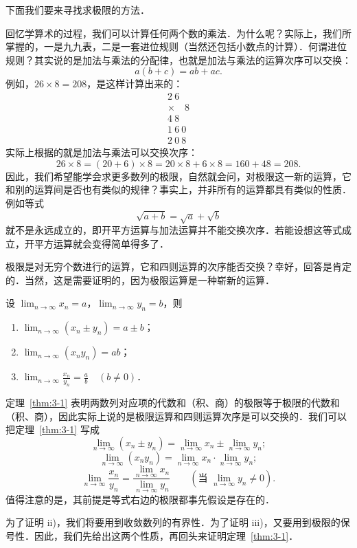 下面我们要来寻找求极限的方法．

回忆学算术的过程，我们可以计算任何两个数的乘法．为什么呢？实际上，我们所掌握的，一是九九表，二是一套进位规则（当然还包括小数点的计算）．何谓进位规则？其实说的是加法与乘法的分配律，也就是加法与乘法的运算次序可以交换：
\[
a(b+c) = ab + ac.
\]
例如，$26 \times 8 = 208$，是这样计算出来的：
\[
\begin{array}{r}
2\ 6 \\
\times \quad 8 \\
\hline
4\ 8 \\
1\ 6\ 0 \\
\hline
2\ 0\ 8
\end{array}
\]
实际上根据的就是加法与乘法可以交换次序：
\[
26\times8 = (20+6)\times8 = 20\times8 + 6\times8 = 160 + 48 = 208.
\]
因此，我们希望能学会求更多数列的极限，自然就会问，对极限这一新的运算，它和别的运算间是否也有类似的规律？事实上，并非所有的运算都具有类似的性质．例如等式
\[
\sqrt{a+b} = \sqrt{a} + \sqrt{b}
\]
就不是永远成立的，即开平方运算与加法运算并不能交换次序．若能设想这等式成立，开平方运算就会变得简单得多了．

极限是对无穷个数进行的运算，它和四则运算的次序能否交换？幸好，回答是肯定的．当然，这是需要证明的，因为极限运算是一种崭新的运算．

\begin{theorem}\label{thm:3-1}
设 $\lim_{n\to\infty}x_n = a$，$\lim_{n\to\infty}y_n = b$，则
\begin{enumerate}[label=\roman*)]
\item $\lim_{n\to\infty}(x_n \pm y_n) = a \pm b$；
\item $\lim_{n \to \infty} (x_n y_n) = ab$；
\item $\lim_{n \to \infty} \frac{x_n}{y_n} = \frac{a}{b} \quad (b \neq 0)$．
\end{enumerate}
\end{theorem}

定理~\ref{thm:3-1} 表明两数列对应项的代数和（积、商）的极限等于极限的代数和（积、商），因此实际上说的是极限运算和四则运算次序是可以交换的．我们可以把定理~\ref{thm:3-1} 写成
\[
\lim_{n\to\infty}(x_n \pm y_n) = \lim_{n\to\infty}x_n \pm \lim_{n\to\infty}y_n;
\]
\[
\lim_{n\to\infty}(x_n y_n) = \lim_{n\to\infty}x_n \cdot \lim_{n\to\infty}y_n;
\]
\[
\lim_{n\to\infty}\frac{x_n}{y_n} = \frac{\lim\limits_{n\to\infty}x_n}{\lim\limits_{n\to\infty}y_n}\qquad \left(\text{当 }\lim_{n\to\infty}y_n \neq 0\right).
\]
值得注意的是，其前提是等式右边的极限都事先假设是存在的．

为了证明 ii)，我们将要用到收敛数列的有界性．为了证明 iii)，又要用到极限的保号性．因此，我们先给出这两个性质，再回头来证明定理~\ref{thm:3-1}．

